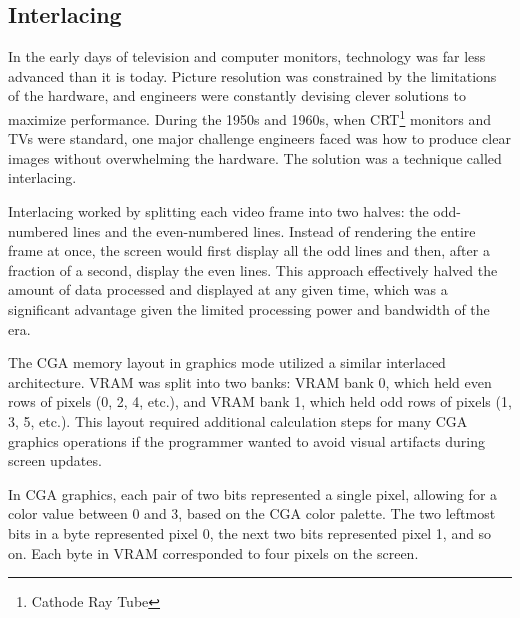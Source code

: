 \documentclass[book.tex]{subfiles}
\begin{document}
\par
\begin{minipage}{\textwidth}
  
\end{minipage}










\subsection{Interlacing}
In the early days of television and computer monitors, technology was far less advanced than it is today. Picture resolution was constrained by the limitations of the hardware, and engineers were constantly devising clever solutions to maximize performance. During the 1950s and 1960s, when CRT\footnote{Cathode Ray Tube} monitors and TVs were standard, one major challenge engineers faced was how to produce clear images without overwhelming the hardware. The solution was a technique called interlacing.\\

\par
Interlacing worked by splitting each video frame into two halves: the odd-numbered lines and the even-numbered lines. Instead of rendering the entire frame at once, the screen would first display all the odd lines and then, after a fraction of a second, display the even lines. This approach effectively halved the amount of data processed and displayed at any given time, which was a significant advantage given the limited processing power and bandwidth of the era.\\

\par
The CGA memory layout in graphics mode utilized a similar interlaced architecture. VRAM was split into two banks: VRAM bank 0, which held even rows of pixels (0, 2, 4, etc.), and VRAM bank 1, which held odd rows of pixels (1, 3, 5, etc.). This layout required additional calculation steps for many CGA graphics operations if the programmer wanted to avoid visual artifacts during screen updates.\\

\par
In CGA graphics, each pair of two bits represented a single pixel, allowing for a color value between 0 and 3, based on the CGA color palette. The two leftmost bits in a byte represented pixel 0, the next two bits represented pixel 1, and so on. Each byte in VRAM corresponded to four pixels on the screen.\\
\end{document}

